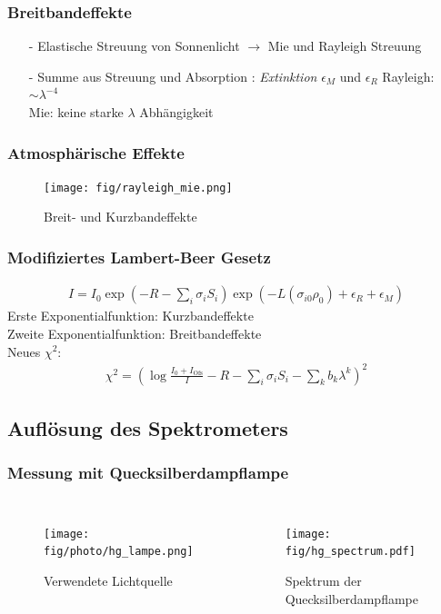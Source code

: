 \documentclass{beamer}
\begin{document}
\begin{frame}
    \frametitle{Breitbandeffekte}
    \begin{itemize}
        \item[-] Elastische Streuung von Sonnenlicht $\to$ Mie und Rayleigh Streuung
            \pause
        \item[-] Summe aus Streuung und Absorption : \textit{Extinktion} $\epsilon_M$ und $\epsilon_R$
            \pause
    Rayleigh: $\sim \lambda^{-4}$\\
    Mie: keine starke $\lambda$ Abhängigkeit
    \end{itemize}
\end{frame}

\begin{frame}
    \frametitle{Atmosphärische Effekte}
    \begin{figure}
    	\texttt{[image: fig/rayleigh\_mie.png]}
    	\caption{Breit- und Kurzbandeffekte \cite{platt10}}
    \end{figure}
\end{frame}

\begin{frame}
    \frametitle{Modifiziertes Lambert-Beer Gesetz}
    \begin{align}
        I = I_0 \exp(-R - \sum_i \sigma_i S_i) \exp\left( -L (\sigma_{i0}\rho_0) + \epsilon_R + \epsilon_M\right)
    \end{align}
    Erste Exponentialfunktion: Kurzbandeffekte\\
    Zweite Exponentialfunktion: Breitbandeffekte\\
    \pause
    Neues $\chi^2$:
    \begin{align}
        \chi^2 = \left( \log\frac{I_0 + I_\text{Ofs}}{I} - R - \sum_i \sigma_i S_i - \sum_k b_k \lambda^k \right)^2
    \end{align}
\end{frame}

\begin{frame}
    \section{Auflösung des Spektrometers}
    \frametitle{Messung mit Quecksilberdampflampe}
    \begin{columns}
    	\begin{figure}
        	\texttt{[image: fig/photo/hg\_lampe.png]}
        	\caption{Verwendete Lichtquelle}
    	\end{figure}
		\begin{figure}
        	\texttt{[image: fig/hg\_spectrum.pdf]}
        	\caption{Spektrum der Quecksilberdampflampe}
    	\end{figure}
    \end{columns}
\end{frame}
\end{document}
